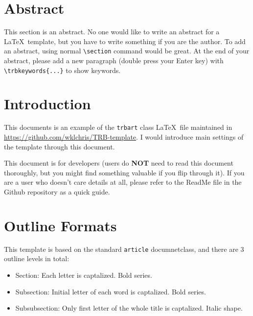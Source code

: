 \documentclass[12pt]{trbart}
\begin{document}
\linenumbers%
\maketitle

\section{Abstract}

This section is an abstract. No one would like to write an abstract for a \LaTeX\ template, but you have to write something if you are the author. To add an abstract, using normal \verb+\section+ command would be great. At the end of your abstract, please add a new paragraph (double press your Enter key) with \verb+\trbkeywords{...}+ to show keywords.



\section{Introduction}
This documents is an example of the \texttt{trbart} class \LaTeX\ file maintained in \url{https://github.com/wklchris/TRB-template}. I would introduce main settings of the template through this document.

This document is for developers (users do \textbf{NOT} need to read this document thoroughly, but you might find something valuable if you flip through it). If you are a user who doesn't care details at all, please refer to the ReadMe file in the Github repository as a quick guide.


\section{Outline Formats}
This template is based on the standard \texttt{article} documnetclass, and there are 3 outline levels in total:
\begin{itemize}
    \item Section: Each letter is captalized. Bold series.
    \item Subsection: Initial letter of each word is captalized. Bold series.
    \item Subsubsection: Only first letter of the whole title is captalized. Italic shape.
\end{itemize}
\end{document}
